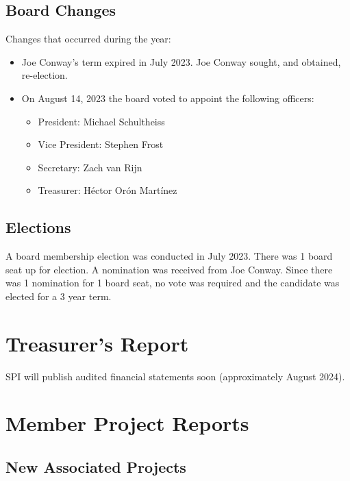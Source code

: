 \documentclass[a4paper]{report}
\begin{document}
\section{Board Changes}

Changes that occurred during the year:

\begin{itemize}

\item Joe Conway's term expired in July 2023.  Joe Conway sought, and obtained, re-election.

\item On August 14, 2023 the board voted to appoint the following officers:

\begin{itemize}
\item President: Michael Schultheiss
\item Vice President: Stephen Frost
\item Secretary: Zach van Rijn
\item Treasurer: Héctor Orón Martínez
\end{itemize}

\end{itemize}

\section{Elections}

A board membership election was conducted in July 2023.  There was 1 board seat up for election.  A nomination was received from Joe Conway.  Since there was 1 nomination for 1 board seat, no vote was required and the candidate was elected for a 3 year term.

\chapter{Treasurer's Report}

SPI will publish audited financial statements soon (approximately August 2024).

\chapter{Member Project Reports}

\section{New Associated Projects}
\end{document}
